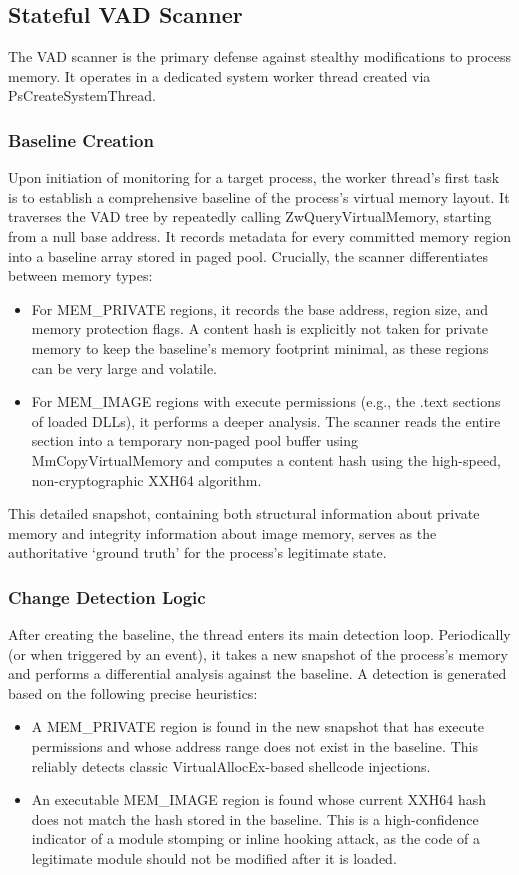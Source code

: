 \documentclass[journal]{IEEEtran}
\begin{document}
\subsection{Stateful VAD Scanner}
The VAD scanner is the primary defense against stealthy modifications to process memory. It operates in a dedicated system worker thread created via PsCreateSystemThread.
\subsubsection{Baseline Creation}
Upon initiation of monitoring for a target process, the worker thread's first task is to establish a comprehensive baseline of the process's virtual memory layout. It traverses the VAD tree by repeatedly calling ZwQueryVirtualMemory, starting from a null base address. It records metadata for every committed memory region into a baseline array stored in paged pool. Crucially, the scanner differentiates between memory types:
\begin{itemize}
\item For MEM\_PRIVATE regions, it records the base address, region size, and memory protection flags. A content hash is explicitly not taken for private memory to keep the baseline's memory footprint minimal, as these regions can be very large and volatile.
\item For MEM\_IMAGE regions with execute permissions (e.g., the .text sections of loaded DLLs), it performs a deeper analysis. The scanner reads the entire section into a temporary non-paged pool buffer using MmCopyVirtualMemory and computes a content hash using the high-speed, non-cryptographic XXH64 algorithm.
\end{itemize}
This detailed snapshot, containing both structural information about private memory and integrity information about image memory, serves as the authoritative `ground truth' for the process's legitimate state.
\subsubsection{Change Detection Logic}
After creating the baseline, the thread enters its main detection loop. Periodically (or when triggered by an event), it takes a new snapshot of the process's memory and performs a differential analysis against the baseline. A detection is generated based on the following precise heuristics:
\begin{itemize}
\item  A MEM\_PRIVATE region is found in the new snapshot that has execute permissions and whose address range does not exist in the baseline. This reliably detects classic VirtualAllocEx-based shellcode injections.
\item An executable MEM\_IMAGE region is found whose current XXH64 hash does not match the hash stored in the baseline. This is a high-confidence indicator of a module stomping or inline hooking attack, as the code of a legitimate module should not be modified after it is loaded.
\end{itemize}
\end{document}
